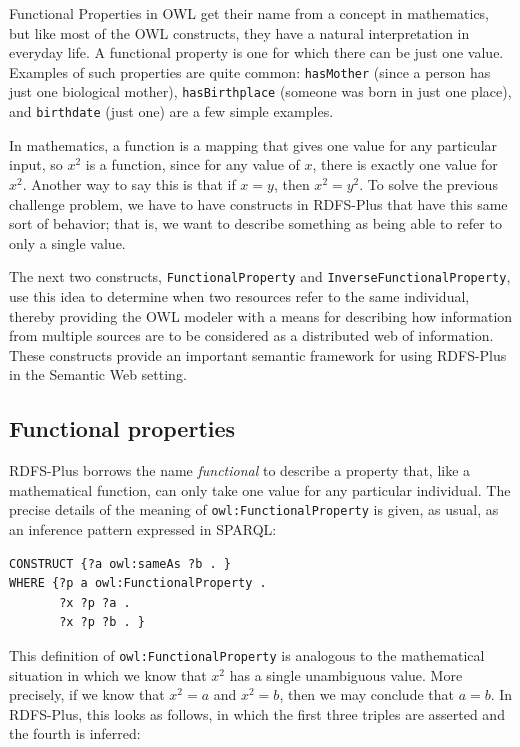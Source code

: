 Functional Properties in OWL get their name from a concept in
mathematics, but like most of the OWL constructs, they have a natural
interpretation in everyday life. A functional property is one for which
there can be just one value. Examples of such properties are quite
common: \texttt{hasMother} (since a person has just one biological mother),
\texttt{hasBirthplace} (someone was born in just one place), and \texttt{birthdate} (just
one) are a few simple examples.

In mathematics, a function is a mapping that gives one value for any
particular input, so $x^2$ is
a function, since for any value of $x$, there is exactly one value for $x^2$.
Another way to say this is that if
$x = y$, then $x^2 = y^2$. To solve the previous challenge problem, we have to
have constructs in RDFS-Plus that have this same sort of behavior; that
is, we want to describe something as being able to refer to only a
single value.

The next two constructs, \texttt{FunctionalProperty} and
\texttt{InverseFunctionalProperty}, use this idea to determine when two resources
refer to the same individual, thereby providing the OWL modeler with a
means for describing how information from multiple sources are to be
considered as a distributed web of information. These constructs provide
an important semantic framework for using RDFS-Plus in the Semantic Web
setting.

\subsection{Functional properties}

RDFS-Plus borrows the name \emph{functional} to describe a property that, like
a mathematical function, can only take one value for any particular
individual. The precise details of the meaning of \texttt{owl:FunctionalProperty}
is given, as usual, as an inference pattern expressed in SPARQL:

\begin{lstlisting}
CONSTRUCT {?a owl:sameAs ?b . }
WHERE {?p a owl:FunctionalProperty .
       ?x ?p ?a .
       ?x ?p ?b . }
\end{lstlisting}

This definition of \texttt{owl:FunctionalProperty} is analogous to the
mathematical situation in which we know that $x^2$ has a single unambiguous
value. More precisely, if we know that $x^2 = a$ and $x^2 = b$, then we may
conclude that $a = b$. In RDFS-Plus, this looks as follows, in which the
first three triples are asserted and the fourth is inferred:

